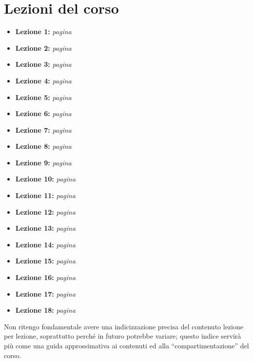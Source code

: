\documentclass[a4paper,twoside]{book}
\begin{document}
	
	
	\newpage
	\section*{Lezioni del corso}
	\renewcommand{\labelitemi}{$\blacksquare$}
	\begin{itemize}
		\item {\large \textbf{Lezione 1:} \textit{pagina \pageref{lezione1}}}
		\item {\large \textbf{Lezione 2:} \textit{pagina \pageref{lezione2}}}
		\item {\large \textbf{Lezione 3:} \textit{pagina \pageref{lezione3}}}
		\item {\large \textbf{Lezione 4:} \textit{pagina \pageref{lezione4}}}
		\item {\large \textbf{Lezione 5:} \textit{pagina \pageref{lezione5}}}
		\item {\large \textbf{Lezione 6:} \textit{pagina \pageref{lezione6}}}
		\item {\large \textbf{Lezione 7:} \textit{pagina \pageref{lezione7}}}
		\item {\large \textbf{Lezione 8:} \textit{pagina \pageref{lezione8}}}
		\item {\large \textbf{Lezione 9:} \textit{pagina \pageref{lezione9}}}
		\item {\large \textbf{Lezione 10:} \textit{pagina \pageref{lezione10}}}
		\item {\large \textbf{Lezione 11:} \textit{pagina \pageref{lezione11}}}
		\item {\large \textbf{Lezione 12:} \textit{pagina \pageref{lezione12}}}
		\item {\large \textbf{Lezione 13:} \textit{pagina \pageref{lezione13}}}
		\item {\large \textbf{Lezione 14:} \textit{pagina \pageref{lezione14}}}
		\item {\large \textbf{Lezione 15:} \textit{pagina \pageref{lezione15}}}
		\item {\large \textbf{Lezione 16:} \textit{pagina \pageref{lezione16}}}
		\item {\large \textbf{Lezione 17:} \textit{pagina \pageref{lezione17}}}
		\item {\large \textbf{Lezione 18:} \textit{pagina \pageref{lezione18}}}
	\end{itemize}
	\renewcommand{\labelitemi}{$\bullet$}
	Non ritengo fondamentale avere una indicizzazione precisa del contenuto lezione per lezione, soprattutto perché in futuro potrebbe variare; questo indice servirà più come una guida approssimativa ai contenuti ed alla \enquote{compartimentazione} del corso.
	
\end{document}
